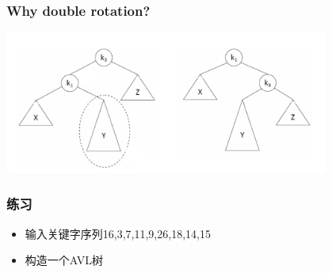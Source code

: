 \begin{frame}[fragile]
  \frametitle{Why double rotation?}
  \includegraphics[width=0.8\textwidth]{figs/AVL-8.png}
\end{frame}

\begin{frame}[fragile]
  \frametitle{练习}
  \begin{itemize}
  \item 输入关键字序列16,3,7,11,9,26,18,14,15
  \item 构造一个AVL树
  \end{itemize}
\end{frame}

